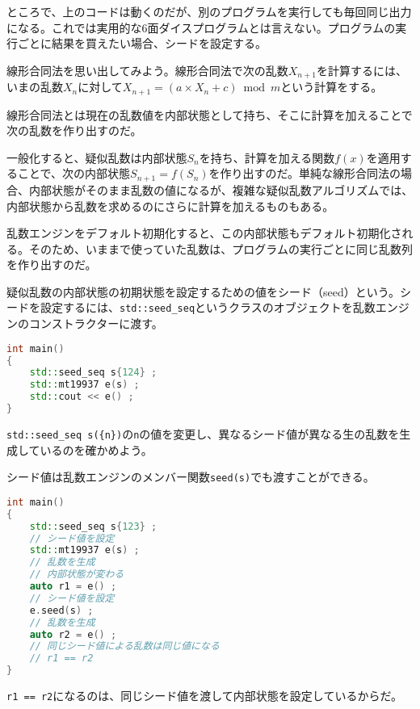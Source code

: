 ところで、上のコードは動くのだが、別のプログラムを実行しても毎回同じ出力になる。これでは実用的な6面ダイスプログラムとは言えない。プログラムの実行ごとに結果を買えたい場合、シードを設定する。


線形合同法を思い出してみよう。線形合同法で次の乱数\(X_{n+1}\)を計算するには、いまの乱数\(X_{n}\)に対して\(X_{n+1} = (a \times X_{n} + c) \bmod m\)という計算をする。

線形合同法とは現在の乱数値を内部状態として持ち、そこに計算を加えることで次の乱数を作り出すのだ。

一般化すると、疑似乱数は内部状態\(S_n\)を持ち、計算を加える関数\(f(x)\)を適用することで、次の内部状態\(S_{n+1}=f(S_n)\)を作り出すのだ。単純な線形合同法の場合、内部状態がそのまま乱数の値になるが、複雑な疑似乱数アルゴリズムでは、内部状態から乱数を求めるのにさらに計算を加えるものもある。

乱数エンジンをデフォルト初期化すると、この内部状態もデフォルト初期化される。そのため、いままで使っていた乱数は、プログラムの実行ごとに同じ乱数列を作り出すのだ。

疑似乱数の内部状態の初期状態を設定するための値をシード（seed）という。シードを設定するには、\texttt{std::seed\_seq}というクラスのオブジェクトを乱数エンジンのコンストラクターに渡す。

\begin{lstlisting}[language={C++}]
int main()
{
    std::seed_seq s{124} ;
    std::mt19937 e(s) ;
    std::cout << e() ;
}
\end{lstlisting}

\texttt{std::seed\_seq s(\{n\})}の\texttt{n}の値を変更し、異なるシード値が異なる生の乱数を生成しているのを確かめよう。

シード値は乱数エンジンのメンバー関数\texttt{seed(s)}でも渡すことができる。

\begin{lstlisting}[language={C++}]
int main()
{
    std::seed_seq s{123} ;
    // シード値を設定
    std::mt19937 e(s) ;
    // 乱数を生成
    // 内部状態が変わる
    auto r1 = e() ;
    // シード値を設定
    e.seed(s) ;
    // 乱数を生成
    auto r2 = e() ;
    // 同じシード値による乱数は同じ値になる
    // r1 == r2
}
\end{lstlisting}

\texttt{r1 == r2}になるのは、同じシード値を渡して内部状態を設定しているからだ。

